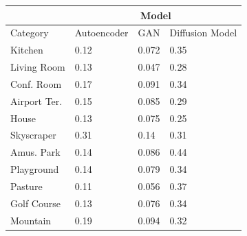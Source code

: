 \documentclass{UoYCSproject}
\begin{document}

\begin{table}[]
    \centering
    \begin{tabular}{|l|lll|}
        \hline
        \multicolumn{1}{|c|}{} & \multicolumn{3}{c|}{Model}                                                                          \\ \hline
        Category               & \multicolumn{1}{c|}{Autoencoder} & \multicolumn{1}{c|}{GAN}  & \multicolumn{1}{c|}{Diffusion Model} \\ \hline
        Kitchen                & \multicolumn{1}{l|}{0.12}        & \multicolumn{1}{l|}{0.072}& 0.35                                    \\ \hline
        Living Room            & \multicolumn{1}{l|}{0.13}        & \multicolumn{1}{l|}{0.047}& 0.28                                    \\ \hline
        Conf. Room             & \multicolumn{1}{l|}{0.17}        & \multicolumn{1}{l|}{0.091}& 0.34                                    \\ \hline
        Airport Ter.           & \multicolumn{1}{l|}{0.15}        & \multicolumn{1}{l|}{0.085}& 0.29                                    \\ \hline
        House                  & \multicolumn{1}{l|}{0.13}        & \multicolumn{1}{l|}{0.075}& 0.25                                    \\ \hline
        Skyscraper             & \multicolumn{1}{l|}{0.31}        & \multicolumn{1}{l|}{0.14 }& 0.31                                    \\ \hline
        Amus. Park             & \multicolumn{1}{l|}{0.14}        & \multicolumn{1}{l|}{0.086}& 0.44                                    \\ \hline
        Playground             & \multicolumn{1}{l|}{0.14}        & \multicolumn{1}{l|}{0.079}& 0.34                                    \\ \hline
        Pasture                & \multicolumn{1}{l|}{0.11}        & \multicolumn{1}{l|}{0.056}& 0.37                                    \\ \hline
        Golf Course            & \multicolumn{1}{l|}{0.13}        & \multicolumn{1}{l|}{0.076}& 0.34                                    \\ \hline
        Mountain               & \multicolumn{1}{l|}{0.19}        & \multicolumn{1}{l|}{0.094}& 0.32                                    \\ \hline

\end{tabular}
\end{table}
\end{document}
